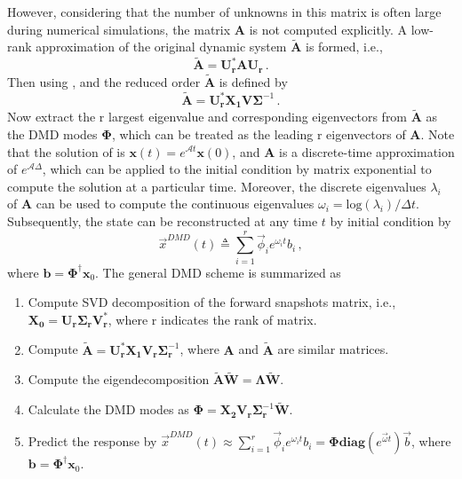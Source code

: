 However, considering that the number of unknowns in this matrix is often large during numerical simulations, the matrix $\mathbf{A}$ is not computed explicitly.
A low-rank approximation of the original dynamic system $\mathbf{\tilde{A}}$ is formed, i.e.,
\begin{equation}
\label{eq:reduced_dmd_1}
\mathbf{\tilde{A}} =  \mathbf{U_r^* A U_r} \, .
\end{equation}
Then using , and the reduced order $\mathbf{\tilde{A}}$ is defined by
\begin{equation}
\label{eq:reduced_dmd_2}
\mathbf{\tilde{A}} =  \mathbf{U_r^*} \mathbf{X_1} \mathbf{V} \bm{\Sigma}^{-1} \, .
\end{equation}
Now extract the r largest eigenvalue and corresponding eigenvectors from $\mathbf{\tilde{A}}$ as the DMD modes $\boldsymbol{\Phi}$, which can be treated as the leading r eigenvectors of $\mathbf{A}$.
Note that the solution of  is $\mathbf{x}(t) = e^{\mathcal{A}t}\mathbf{x}(0)$, and $\mathbf{A}$ is a discrete-time approximation of $e^{\mathcal{A}\Delta}$, which can be applied to the initial condition by matrix exponential to compute the solution at a particular time. 
Moreover, the discrete eigenvalues $\lambda_i$ of $\mathbf{A}$ can be used to compute the continuous eigenvalues $\omega_i= \text{log}(\lambda_i)/\Delta t$. Subsequently, the state can be reconstructed at any time $t$ by initial condition by  
\begin{equation}
\label{eq:dmd_predict}
\vec{x}^{DMD}(t) \triangleq \sum_{i=1}^{r} \vec{\phi}_i e^{\omega_it} b_i \, ,
\end{equation}
where $\mathbf{b}=\boldsymbol{\Phi}^{\dag} \mathbf{x}_{0}$. 
The general DMD scheme is summarized as

\begin{enumerate}
\item Compute SVD decomposition of the forward snapshots matrix, i.e., $ \mathbf{X_0} = \mathbf{U_r} \boldsymbol{\Sigma_r} \mathbf{V_r^{*}}$, where r indicates the rank of matrix.
\item Compute $\mathbf{\tilde{A}}=\mathbf{U_r^{*}X_1}\mathbf{V_r}\boldsymbol{\Sigma}_{\mathbf{r}}^{-1}$, where $\mathbf{A}$ and $\mathbf{\tilde{A}}$ are similar matrices.
\item Compute the eigendecomposition $\mathbf{\tilde{A} \tilde{W}}=\boldsymbol{\Lambda}\mathbf{\tilde{W}}$.
\item Calculate the DMD modes as ${\boldsymbol{\Phi}}={\mathbf{X_2V_r}}\boldsymbol{\Sigma}_\mathbf{r}^{-1}{\mathbf{\tilde{W}}}$.
\item Predict the response by $\vec{x}^{DMD}(t) \approx \sum_{i=1}^{r} \vec{\phi}_i e^{\omega_it} b_i = \boldsymbol{\Phi}{\mathbf{diag}}(e^{\vec{\omega}t})\vec{b}$, where $\mathbf{b}=\boldsymbol{\Phi}^{\dag} \mathbf{x}_{0}$.
\end{enumerate}

